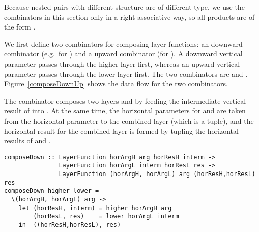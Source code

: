 \documentclass[preprint,natbib]{sigplanconf}
\begin{document}
\bc Because nested pairs with different structure are of different type, we use the combinators in this section only in a right-associative way, so all products are of the form . 
\ec

We first define two combinators for composing layer functions: an downward combinator (e.g.\ for ) and a upward combinator (for ). A downward vertical parameter passes through the higher layer first, whereas an upward vertical parameter passes through the lower layer first. The two combinators are  and . Figure~\ref{composeDownUp} shows the data flow for the two combinators. 

The combinator  composes two layers  and  by feeding the intermediate vertical result of  into . At the same time, the horizontal parameters for  and  are taken from the horizontal parameter to the combined layer (which is a tuple), and the horizontal result for the combined layer is formed by tupling the horizontal results of  and . 

\begin{small}
\begin{verbatim}
composeDown :: LayerFunction horArgH arg horResH interm ->
               LayerFunction horArgL interm horResL res ->
               LayerFunction (horArgH, horArgL) arg (horResH,horResL) res
composeDown higher lower = 
  \(horArgH, horArgL) arg ->                                           
    let (horResH, interm) = higher horArgH arg
        (horResL, res)    = lower horArgL interm
    in  ((horResH,horResL), res)
\end{verbatim}
\end{small}
\end{document}
